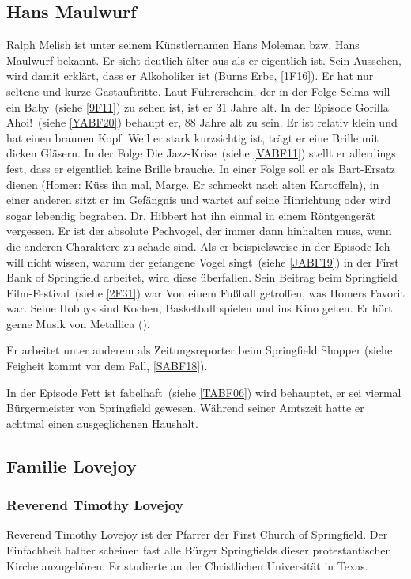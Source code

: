 {\subsection{Hans Maulwurf}\label{HansMaulwurf}
Ralph Melish ist unter seinem Künstlernamen Hans Moleman bzw. Hans Maulwurf bekannt. Er sieht deutlich älter aus als er eigentlich ist. Sein Aussehen, wird damit erklärt, dass er Alkoholiker ist (\glqq Burns Erbe\grqq , \ref{1F16}). Er hat nur seltene und kurze Gastauftritte. Laut Führerschein, der in der Folge \glqq Selma will ein Baby\grqq\ (siehe \ref{9F11}) zu sehen ist, ist er 31 Jahre alt. In der Episode \glqq Gorilla Ahoi!\grqq\ (siehe \ref{YABF20}) behaupt er, 88 Jahre alt zu sein. Er ist relativ klein und hat einen braunen Kopf. Weil er stark kurzsichtig ist, trägt er eine Brille mit dicken Gläsern. In der Folge \glqq Die Jazz-Krise\grqq\ (siehe \ref{VABF11}) stellt er allerdings fest, dass er eigentlich keine Brille brauche. In einer Folge soll er als Bart-Ersatz dienen (Homer: \glqq Küss ihn mal, Marge. Er schmeckt nach alten Kartoffeln\grqq ), in einer anderen sitzt er im Gefängnis und wartet auf seine Hinrichtung oder wird sogar lebendig begraben. Dr. Hibbert hat ihn einmal in einem Röntgengerät vergessen. Er ist der absolute Pechvogel, der immer dann hinhalten muss, wenn die anderen Charaktere zu schade sind. Als er beispielsweise in der Episode \glqq Ich will nicht wissen, warum der gefangene Vogel singt\grqq\ (siehe \ref{JABF19}) in der First Bank of Springfield arbeitet, wird diese überfallen. Sein Beitrag beim \glqq Springfield Film-Festival\grqq\ (siehe \ref{2F31}) war \glqq Von einem Fußball getroffen\grqq , was Homers Favorit war. Seine Hobbys sind Kochen, Basketball spielen und ins Kino gehen. Er hört gerne Musik von Metallica (\cite{ET742}).

Er arbeitet unter anderem als Zeitungsreporter beim Springfield Shopper (siehe \glqq Feigheit kommt vor dem Fall\grqq , \ref{SABF18}).

In der Episode \glqq Fett ist fabelhaft\grqq\ (siehe \ref{TABF06}) wird behauptet, er sei viermal Bürgermeister von Springfield gewesen. Während seiner Amtszeit hatte er achtmal einen ausgeglichenen Haushalt.

\subsection{Familie Lovejoy}

\subsubsection{Reverend Timothy Lovejoy}\label{TimothyLovejoy}
Reverend Timothy Lovejoy ist der Pfarrer der \glqq First Church of Springfield\grqq . Der Einfachheit halber scheinen fast alle Bürger Springfields dieser protestantischen Kirche anzugehören. Er studierte an der Christlichen Universität in Texas.

}

